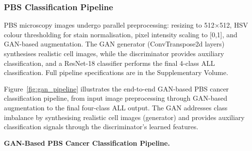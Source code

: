\subsubsection{PBS Classification Pipeline}

PBS microscopy images undergo parallel preprocessing: resizing to 512$\times$512, HSV colour thresholding for stain normalisation, pixel intensity scaling to [0,1], and GAN-based augmentation. The GAN generator (ConvTranspose2d layers) synthesises realistic cell images, while the discriminator provides auxiliary classification, and a ResNet-18 classifier performs the final 4-class ALL classification. Full pipeline specifications are in the Supplementary Volume.


Figure~\ref{fig:gan_pipeline} illustrates the end-to-end GAN-based PBS cancer classification pipeline, from input image preprocessing through GAN-based augmentation to the final four-class ALL output. The GAN addresses class imbalance by synthesising realistic cell images (generator) and provides auxiliary classification signals through the discriminator's learned features.


\iffalse %
\noindent\textbf{GAN-Based PBS Cancer Classification Pipeline.}

